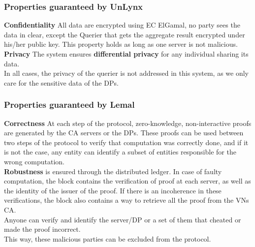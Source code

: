 \documentclass{article}
\begin{document}
\subsubsection{Properties guaranteed by UnLynx}
\textbf{Confidentiality} All data are encrypted using EC ElGamal, no party sees the data in clear, except the Querier that gets the aggregate result encrypted under his/her public key. This property holds as long as one server is not malicious.\\
\textbf{Privacy} The system ensures \textbf{differential privacy} for any individual sharing its data.\\
In all cases, the privacy of the querier is not addressed in this system, as we only care for the sensitive data of the DPs.\\
\subsubsection{Properties guaranteed by Lemal}
\textbf{Correctness} At each step of the protocol, zero-knowledge, non-interactive proofs are generated by the CA servers or the DPs. These proofs can be used between two steps of the protocol to verify that computation was correctly done, and if it is not the case, any entity can identify a subset of entities responsible for the wrong computation.\\
\textbf{Robustness} is ensured through the distributed ledger. In case of faulty computation, the block contains the verification of proof at each server, as well as the identity of the issuer of the proof.
If there is an incoherence in these verifications, the block also contains a way to retrieve all the proof from the VNs CA.\\
Anyone can verify and identify the server/DP or a set of them that cheated or made the proof incorrect.\\
This way, these malicious parties can be excluded from the protocol.
\end{document}
